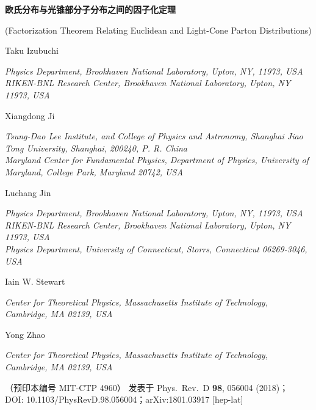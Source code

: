\documentclass[11pt]{ctexart}
\begin{document}
\begin{center}
	{\LARGE\bfseries 欧氏分布与光锥部分子分布之间的因子化定理\par}
	\vspace{0.6em}
	{\small (Factorization Theorem Relating Euclidean and Light-Cone Parton Distributions)\par}
	\vspace{1.4em}
	{\large Taku Izubuchi\par}
	{\small\itshape Physics Department, Brookhaven National Laboratory, Upton, NY, 11973, USA\\
	RIKEN-BNL Research Center, Brookhaven National Laboratory, Upton, NY 11973, USA\par}
	\vspace{0.9em}
	{\large Xiangdong Ji\par}
	{\small\itshape Tsung-Dao Lee Institute, and College of Physics and Astronomy,
	Shanghai Jiao Tong University, Shanghai, 200240, P. R. China\\
	Maryland Center for Fundamental Physics, Department of Physics,
	University of Maryland, College Park, Maryland 20742, USA\par}
	\vspace{0.9em}
	{\large Luchang Jin\par}
	{\small\itshape Physics Department, Brookhaven National Laboratory, Upton, NY, 11973, USA\\
	RIKEN-BNL Research Center, Brookhaven National Laboratory, Upton, NY 11973, USA\\
	Physics Department, University of Connecticut, Storrs, Connecticut 06269-3046, USA\par}
	\vspace{0.9em}
	{\large Iain W. Stewart\par}
	{\small\itshape Center for Theoretical Physics, Massachusetts Institute of Technology, Cambridge, MA 02139, USA\par}
	\vspace{0.9em}
	{\large Yong Zhao\par}
	{\small\itshape Center for Theoretical Physics, Massachusetts Institute of Technology, Cambridge, MA 02139, USA\par}
	\vspace{1.2em}
	{\footnotesize （预印本编号 MIT-CTP 4960）\quad
	发表于 Phys.\ Rev.\ D {\bf 98}, 056004 (2018)；\\
	DOI: 10.1103/PhysRevD.98.056004；\quad arXiv:1801.03917 [hep-lat]\par}
\end{center}
\end{document}
